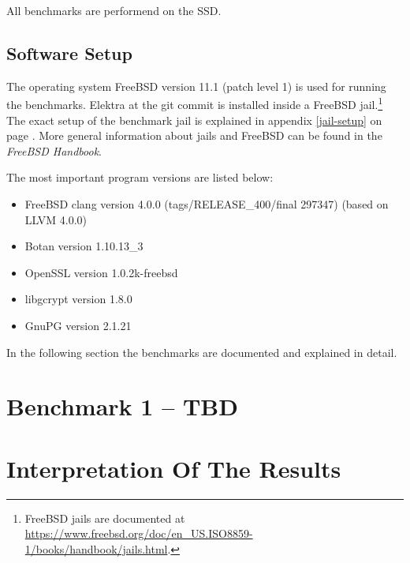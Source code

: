 All benchmarks are performend on the SSD.

  \subsection{Software Setup}

The operating system FreeBSD version 11.1 (patch level 1) is used for running the benchmarks.
Elektra  at the git commit  is installed inside a FreeBSD jail.\footnote{FreeBSD jails
are documented at \url{https://www.freebsd.org/doc/en_US.ISO8859-1/books/handbook/jails.html}.
}
The exact setup of the benchmark jail is explained in appendix \ref{jail-setup} on page \pageref{jail-setup}.
More general information about jails and FreeBSD can be found in the \emph{FreeBSD Handbook}.\cite{freebsd-doc}

The most important program versions are listed below:

\begin{itemize}
  \item FreeBSD clang version 4.0.0 (tags/RELEASE\_400/final 297347) (based on LLVM 4.0.0)
  \item Botan version 1.10.13\_3
  \item OpenSSL version 1.0.2k-freebsd
  \item libgcrypt version 1.8.0
  \item GnuPG version 2.1.21
\end{itemize}

In the following section the benchmarks are documented and explained in detail.

\section{Benchmark 1 -- TBD}

\section{Interpretation Of The Results}
